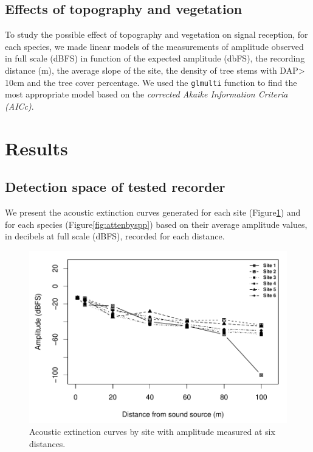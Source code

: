 \documentclass[fleqn,10pt,lineno]{wlpeerj} %
\begin{document}
\hypertarget{effects-of-topography-and-vegetation}{%
\subsection*{Effects of topography and
vegetation}\label{effects-of-topography-and-vegetation}}

To study the possible effect of topography and vegetation on signal
reception, for each species, we made linear models of the measurements
of amplitude observed in full scale (dBFS) in function of the expected
amplitude (dbFS), the recording distance (m), the average slope of the
site, the density of tree stems with DAP\textgreater{} 10cm and the tree
cover percentage. We used the \texttt{glmulti} function to find the most
appropriate model based on the \emph{corrected Akaike Information
Criteria (AICc)}.

\hypertarget{results}{%
\section*{Results}\label{results}}

\hypertarget{detection-space-of-tested-recorder}{%
\subsection*{Detection space of tested
recorder}\label{detection-space-of-tested-recorder}}

We present the acoustic extinction curves generated for each site
(Figure\ref{fig:attenbysite}) and for each species
(Figure\ref{fig:attenbyspp}) based on their average amplitude values, in
decibels at full scale (dBFS), recorded for each distance.

\begin{figure}

{\centering \includegraphics[width=1\linewidth]{ASR_MyPaper_2020_files/figure-latex/attenbysite-1} 

}

\caption{Acoustic extinction curves by site with amplitude measured at six distances.\label{fig:attenbysite}}\label{fig:attenbysite}
\end{figure}
\end{document}
